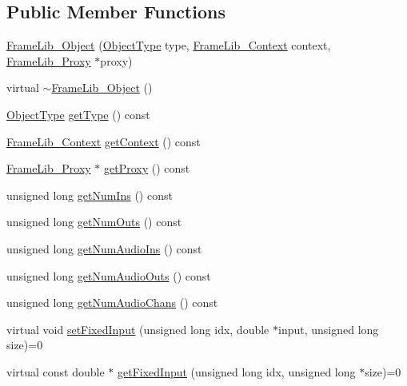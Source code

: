 \subsection*{Public Member Functions}
\begin{DoxyCompactItemize}
\item 
\hyperlink{class_frame_lib___object_ae377e7fd8ca51210af511a9fdc2544e7}{Frame\+Lib\+\_\+\+Object} (\hyperlink{_frame_lib___types_8h_a842c5e2e69277690b064bf363c017980}{Object\+Type} type, \hyperlink{class_frame_lib___context}{Frame\+Lib\+\_\+\+Context} context, \hyperlink{struct_frame_lib___proxy}{Frame\+Lib\+\_\+\+Proxy} $\ast$proxy)
\item 
virtual \hyperlink{class_frame_lib___object_ab88bcc3fe9e1c9da41a4afebb3d05005}{$\sim$\+Frame\+Lib\+\_\+\+Object} ()
\item 
\hyperlink{_frame_lib___types_8h_a842c5e2e69277690b064bf363c017980}{Object\+Type} \hyperlink{class_frame_lib___object_a8d96d1f55054e583a99891ad65f84a3a}{get\+Type} () const
\item 
\hyperlink{class_frame_lib___context}{Frame\+Lib\+\_\+\+Context} \hyperlink{class_frame_lib___object_a8f636902888847c78cf16d74717bd861}{get\+Context} () const
\item 
\hyperlink{struct_frame_lib___proxy}{Frame\+Lib\+\_\+\+Proxy} $\ast$ \hyperlink{class_frame_lib___object_a9aa8f7f487999748f04c39ea2692a8ed}{get\+Proxy} () const
\item 
unsigned long \hyperlink{class_frame_lib___object_a310416236585b52c2de1c47a9aa64b02}{get\+Num\+Ins} () const
\item 
unsigned long \hyperlink{class_frame_lib___object_a255f6ae814dbb946d445ef244dd39975}{get\+Num\+Outs} () const
\item 
unsigned long \hyperlink{class_frame_lib___object_ad29b6281916a933c5baa43cbb7d11efd}{get\+Num\+Audio\+Ins} () const
\item 
unsigned long \hyperlink{class_frame_lib___object_a430c0531a4c38ad49a556af1cca0af88}{get\+Num\+Audio\+Outs} () const
\item 
unsigned long \hyperlink{class_frame_lib___object_a59e6e7dba2d18444be6d5fbee15c73f2}{get\+Num\+Audio\+Chans} () const
\item 
virtual void \hyperlink{class_frame_lib___object_a0d3bed42a21ebf248366f4457722beff}{set\+Fixed\+Input} (unsigned long idx, double $\ast$input, unsigned long size)=0
\item 
virtual const double $\ast$ \hyperlink{class_frame_lib___object_ab34877668c8b6a2ca5efa6bc10368820}{get\+Fixed\+Input} (unsigned long idx, unsigned long $\ast$size)=0

\end{DoxyCompactItemize}
